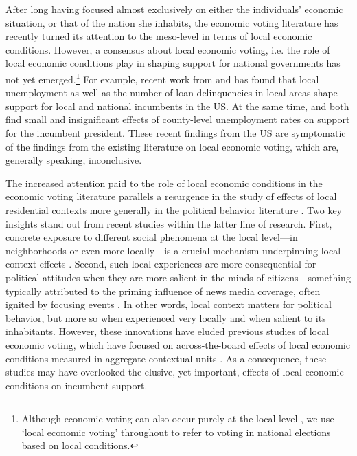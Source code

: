 \documentclass[12pt,a4paper]{article}
\begin{document}
	After long having focused almost exclusively on either the individuals’ economic situation, or that of the nation she inhabits, the economic voting literature has recently turned its attention to the meso-level in terms of local economic conditions. However, a consensus about local economic voting, i.e. the role of local economic conditions play in shaping support for national governments has not yet emerged.\footnote{Although economic voting can also occur purely at the local level \cite[cf.][]{hopkins2017retrospective, burnett2017politics}, we use `local economic voting’ throughout to refer to voting in national elections based on local conditions.} For example, recent work from \cite{hansford2015reevaluating } and \cite{healy2017presidential} has found that local unemployment as well as the number of loan delinquencies in local areas shape support for local and national incumbents in the US. At the same time, \cite{hill2010economic} and \cite{wright2012unemployment} both find small and insignificant effects of county-level unemployment rates on support for the incumbent president. These recent findings from the US are symptomatic of the findings from the existing literature on local economic voting, which are, generally speaking, inconclusive.
	
	The increased attention paid to the role of local economic conditions in the economic voting literature parallels a resurgence in the study of effects of local residential contexts more generally in the political behavior literature \cite[e.g.,][]{hopkins2010politicized,enos2016demolition}. Two key insights stand out from recent studies within the latter line of research. First, concrete exposure to different social phenomena at the local level—in neighborhoods or even more locally—is a crucial mechanism underpinning local context effects \citep{moore2017defining,dinesen2015ethnic,enos2016demolition,hjorth2017influence}. Second, such local experiences are more consequential for political attitudes when they are more salient in the minds of citizens—something typically attributed to the priming influence of news media coverage, often ignited by focusing events \citep{hopkins2010politicized,legewie2013terrorist, davenport2015policy}. In other words, local context matters for political behavior, but more so when experienced very locally and when salient to its inhabitants. However, these innovations have eluded previous studies of local economic voting, which have focused on across-the-board effects of local economic conditions measured in aggregate contextual units \citep[though see][]{bisgaard2016reconsidering,healy2017presidential}. As a consequence, these studies may have overlooked the elusive, yet important, effects of local economic conditions on incumbent support. 
	
\end{document}
